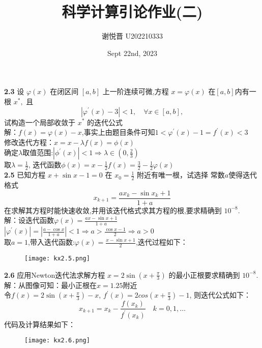 \documentclass[a4paper,11pt,UTF8]{article}
\title{科学计算引论作业(二)}
\author{谢悦晋 \quad U202210333}
\date{Sept 22nd, 2023 }
\begin{document}
\maketitle
\noindent\textbf{2.3} 设 $\varphi(x)$ 在闭区间 $[a,b]$ 上一阶连续可微,方程 $x=\varphi(x)$ 在$[a,b]$内有一根 $x^{*},$ 且
$$
|\varphi^{\prime}(x)-3|<1,\quad\forall x\in[a,b],
$$
试构造一个局部收敛于 $x^{*}$ 的迭代公式\\
解：$f(x)=\varphi(x)-x$,事实上由题目条件可知$1<\varphi^{\prime}(x)-1=f^\prime(x)<3$\\
修改迭代方程：$x=x-\lambda f(x)=\phi(x)$\\
确定$\lambda$取值范围:$\displaystyle|\phi^\prime(x)|<1\Rightarrow \lambda \in (0, \frac23)$\\
取$\displaystyle\lambda=\frac12$, 迭代函数$\displaystyle\phi(x)=x-\frac12 f(x)=\frac32-\frac12\varphi(x)$\\
\textbf{2.5}  已知方程 $x+\sin x-1=0$ 在 $\displaystyle x_{0}=\frac{1}{2}$ 附近有唯一根，试选择
常数$a$使得迭代格式
$$
x_{k+1}=\frac{ax_k-\sin x_k+1}{1+a}
$$
在求解其方程时能快速收敛,并用该迭代格式求其方程的根,要求精确到 $10^{-8}.$\\
解：设迭代函数$\displaystyle\varphi(x)=\frac{ax-\sin x+1}{1+a}$\\
$\displaystyle|\varphi^\prime(x)|=|\frac{a-\cos x}{1+a}|<1\Rightarrow a>\frac{\cos x-1}{2}\Rightarrow a>0$\\
取$a=1$,带入迭代函数:$\displaystyle\varphi(x)=\frac{x-\sin x+1}{2}$,迭代过程如下：
\begin{figure}[H] 
	\centering 
	\texttt{[image: kx2.5.png]}
\end{figure}
\noindent\textbf{2.6} 应用Newton迭代法求解方程 $\displaystyle x=2\sin\left(x+\frac{\pi}{3}\right)$ 的最小正根要求精确到 $10^{-8}.$\\
解：从图像可知：最小正根在$x=1.25$附近\\
令$\displaystyle f(x)=2\sin\left(x+\frac{\pi}{3}\right)-x$, $\displaystyle f^\prime(x)=2cos\left(x+\frac{\pi}{3}\right)-1$, 则迭代公式如下：
$$
	x_{k+1}=x_k-\frac{f(x_k)}{f^\prime(x_k)}\quad k=0,1,\ldots
$$
代码及计算结果如下：
\begin{figure}[H] 
	\centering 
	\texttt{[image: kx2.6.png]}
\end{figure}
\end{document}
